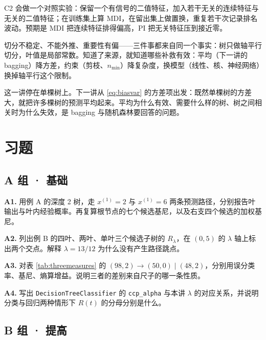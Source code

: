 \documentclass[11pt,a4paper,fontset=windows,zihao=-4]{ctexart}
\begin{document}
C2 会做一个对照实验：保留一个有信号的二值特征，加入若干无关的连续特征与无关的二值特征；在训练集上算 MDI，在留出集上做置换，重复若干次记录排名波动。预期是 MDI 把连续特征排得偏高，PI 把无关特征压到接近零。

\begin{keybox}
切分不稳定、不能外推、重要性有偏——三件事都来自同一个事实：树只做轴平行切分，叶值是局部常数。知道了来源，就知道哪些补救有效：平均（下一讲的 bagging）降方差，约束（剪枝、$n_{\min}$）降复杂度，换模型（线性、核、神经网络）换掉轴平行这个限制。
\end{keybox}

这一讲停在单棵树上。下一讲从 \eqref{eq:biasvar} 的方差项出发：既然单棵树的方差大，就把许多棵树的预测平均起来。平均为什么有效、需要什么样的树、树之间相关时为什么失效，是 bagging 与随机森林要回答的问题。


\clearpage
\section*{习题}
\setlength{\parskip}{0.62em}

\subsection*{A 组 · 基础}

\noindent\textbf{A1.} 用例 A 的深度 2 树，走 $x^{(1)}=2$ 与 $x^{(1)}=6$ 两条预测路径，分别报告叶输出与叶内经验概率。再复算根节点的七个候选基尼，以及右支四个候选的加权基尼。

\noindent\textbf{A2.} 列出例 B 的四叶、两叶、单叶三个候选子树的 $R_\lambda$，在 $(0,5)$ 的 $\lambda$ 轴上标出两个交点。解释 $\lambda=13/12$ 为什么没有产生路径跳点。

\noindent\textbf{A3.} 对表 \ref{tab:threemeasures} 的 $(98,2)\to(50,0)\mid(48,2)$，分别用误分类率、基尼、熵算增益。说明三者的差别来自尺子的哪一条性质。

\noindent\textbf{A4.} 写出 \texttt{DecisionTreeClassifier} 的 \texttt{ccp\_alpha} 与本讲 $\lambda$ 的对应关系，并说明分类与回归两种情形下 $R(t)$ 的分母分别是什么。

\subsection*{B 组 · 提高}
\end{document}
